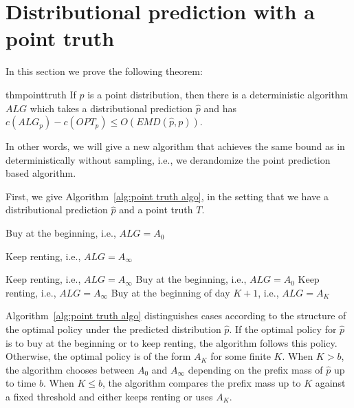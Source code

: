 
\section{Distributional prediction with a point truth}
\label{appendix:point_truth}

In this section we prove the following theorem:

\begin{restatable}{thm}{pointtruth} \label{thm:pointtruth}
    If $p$ is a point distribution, then there is a deterministic algorithm $ALG$ which takes a distributional prediction $\hat p$ and has $c(ALG_p) - c(OPT_p) \leq O(EMD(\hat p, p))$.
\end{restatable} 

In other words, we will give a new algorithm that achieves the same bound as in~\cite{kumar2024improvingonlinealgorithmsml} deterministically without sampling, i.e., we derandomize the point prediction based algorithm. 


First, we give Algorithm~\ref{alg:point truth algo}, in the setting that we have a distributional prediction $\hat{p}$ and a point truth $T$.

\begin{algorithm}
\caption{Deterministic algorithm with additive loss $O(\mathrm{EMD})$ in the $\hat{p}$--$T$ (point truth) setting}
\label{alg:point truth algo}
\begin{algorithmic}[1]

    \STATE Buy at the beginning, i.e., $ALG = A_0$

    \STATE Keep renting, i.e., $ALG = A_\infty$

\ELSE
            \STATE Keep renting, i.e., $ALG = A_\infty$
        \ELSE
            \STATE Buy at the beginning, i.e., $ALG = A_0$
        \ENDIF
    \ELSE
            \STATE Keep renting, i.e., $ALG = A_\infty$
        \ELSE
            \STATE Buy at the beginning of day $K+1$, i.e., $ALG = A_K$
        \ENDIF
    \ENDIF
\ENDIF

\end{algorithmic}
\end{algorithm}

Algorithm~\ref{alg:point truth algo} distinguishes cases according to the structure of the optimal policy under the predicted distribution $\hat p$. If the optimal policy for $\hat p$ is to buy at the beginning or to keep renting, the algorithm follows this policy. Otherwise, the optimal policy is of the form $A_K$ for some finite $K$. When $K>b$, the algorithm chooses between $A_0$ and $A_\infty$ depending on the prefix mass of $\hat p$ up to time $b$. When $K \le b$, the algorithm compares the prefix mass up to $K$ against a fixed threshold and either keeps renting or uses $A_K$. 


